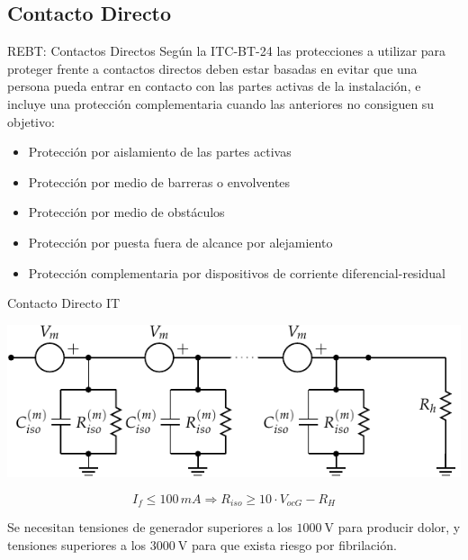 \documentclass[xcolor={usenames,svgnames,dvipsnames}]{beamer}
\begin{document}
\subsection{Contacto Directo}
\label{sec:org3938a68}

\begin{frame}[label={sec:orgc0b7cde}]{REBT: Contactos Directos}
Según la ITC-BT-24 las protecciones a utilizar para proteger frente a
contactos directos deben estar \alert{basadas en evitar que una persona pueda
entrar en contacto con las partes activas} de la instalación, e incluye
una protección complementaria cuando las anteriores no consiguen su
objetivo:

\begin{itemize}
\item Protección por \alert{aislamiento de las partes activas}

\item Protección por medio de \alert{barreras o envolventes}

\item Protección por medio de \alert{obstáculos}

\item Protección por puesta \alert{fuera de alcance} por alejamiento

\item Protección complementaria por \alert{dispositivos de corriente
diferencial}-residual
\end{itemize}
\end{frame}


\begin{frame}[label={sec:org69a77cb}]{Contacto Directo IT}
\begin{center}
\includegraphics[width=.9\linewidth]{../figs/ContactoDirectoIT_Capacidad.pdf}
\end{center}

$$I_{f}\leq100\, mA\Longrightarrow R_{iso}\geq10\cdot V_{ocG}-R_{H}$$

Se necesitan tensiones de generador superiores a los \(\SI{1000}{\volt}\)
para producir dolor, y tensiones superiores a los \(\SI{3000}{\volt}\)
para que exista riesgo por fibrilación.
\end{frame}
\end{document}
